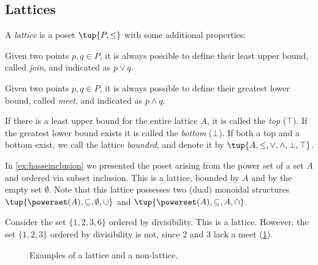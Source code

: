 \subsection{Lattices}
\begin{definition}[Lattice]
\label{def:lattice}
A \emph{lattice} is a poset $\tup{P, \leq}$ with some additional properties:
\begin{compactenum}
    \item Given two points $p, q \in P$, it is always possible to define their least upper bound, called \emph{join}, and indicated as $p \vee q$.
    \item Given two points $p, q \in P$, it is always possible to define their greatest lower bound, called \emph{meet}, and indicated as $p \wedge q$.
\end{compactenum}
\end{definition}

\begin{remark}
If there is a least upper bound for the entire lattice $A$, it is called
the \emph{top} ($\top$). If the greatest lower bound exists it is called the \emph{bottom} ($\bot$). If both a top and a bottom exist, we call the lattice \emph{bounded}, and denote it by $\tup{A,\leq,\vee,\wedge,\bot,\top}$.
\end{remark}

\begin{example}
    In \cref{ex:hasseinclusion} we presented the poset arising from the power set of a set $A$ and ordered via subset inclusion. This is a lattice, bounded by $A$ and by the empty set $\emptyset$. Note that this lattice possesses two (dual) monoidal structures $\tup{\powerset(A),\subseteq,\emptyset,\cup}$ and $\tup{\powerset(A),\subseteq,A,\cap}$.
\end{example}

\begin{example}
Consider the set $\{1,2,3,6\}$ ordered by divisibility. This is a lattice. However, the set $\{1,2,3\}$ ordered by divisibility is not, since 2 and 3 lack a meet (\cref{fig:exlattice}).
\begin{figure}[h!]
\begin{center}
\end{center}
\caption{Examples of a lattice and a non-lattice. \label{fig:exlattice}}
\end{figure}
\end{example}